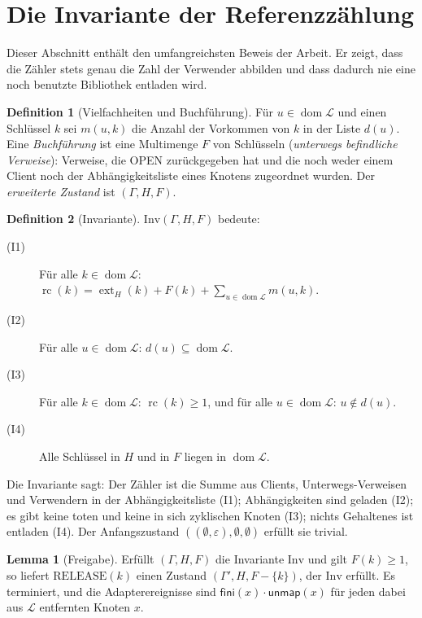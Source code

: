 \documentclass[a4paper,12pt,twoside]{report}
\DeclareRobustCommand{\_}{\ifmmode\mbox{\textunderscore}\else\textunderscore\allowbreak{}\fi}
\theoremstyle{definition}
\newtheorem{definition}{Definition}[chapter]
\newtheorem{lemma}{Lemma}[chapter]
\newcommand{\dom}{\operatorname{dom}}
\newcommand{\ext}{\operatorname{ext}}
\newcommand{\rc}{\operatorname{rc}}
\begin{document}
\section{Die Invariante der Referenzzählung}
\label{sec:rc}

Dieser Abschnitt enthält den umfangreichsten Beweis der Arbeit. Er zeigt, dass die Zähler stets genau die Zahl der Verwender abbilden und dass dadurch nie eine noch benutzte Bibliothek entladen wird.

\begin{definition}[Vielfachheiten und Buchführung]
	Für $u\in\dom\mathcal L$ und einen Schlüssel $k$ sei $m(u,k)$ die Anzahl der Vorkommen von $k$ in der Liste $d(u)$. Eine \emph{Buchführung} ist eine Multimenge $F$ von Schlüsseln (\emph{unterwegs befindliche Verweise}): Verweise, die OPEN zurückgegeben hat und die noch weder einem Client noch der Abhängigkeitsliste eines Knotens zugeordnet wurden. Der \emph{erweiterte Zustand} ist $(\Gamma,H,F)$.
\end{definition}

\begin{definition}[Invariante]
	\label{def:inv}
	$\mathrm{Inv}(\Gamma,H,F)$ bedeute:
	\begin{description}
		\item[(I1)] Für alle $k\in\dom\mathcal L$: $\rc(k)=\ext_H(k)+F(k)+\sum_{u\in\dom\mathcal L}m(u,k)$.
		\item[(I2)] Für alle $u\in\dom\mathcal L$: $d(u)\subseteq\dom\mathcal L$.
		\item[(I3)] Für alle $k\in\dom\mathcal L$: $\rc(k)\ge1$, und für alle $u\in\dom\mathcal L$: $u\notin d(u)$.
		\item[(I4)] Alle Schlüssel in $H$ und in $F$ liegen in $\dom\mathcal L$.
	\end{description}
\end{definition}

Die Invariante sagt: Der Zähler ist die Summe aus Clients, Unterwegs-Verweisen und Verwendern in der Abhängigkeitsliste (I1); Abhängigkeiten sind geladen (I2); es gibt keine toten und keine in sich zyklischen Knoten (I3); nichts Gehaltenes ist entladen (I4). Der Anfangszustand $((\emptyset,\varepsilon),\emptyset,\emptyset)$ erfüllt sie trivial.

\begin{lemma}[Freigabe]
	\label{lem:release}
	Erfüllt $(\Gamma,H,F)$ die Invariante $\mathrm{Inv}$ und gilt $F(k)\ge1$, so liefert $\mathrm{RELEASE}(k)$ einen Zustand $(\Gamma',H,F-\{k\})$, der $\mathrm{Inv}$ erfüllt. Es terminiert, und die Adapterereignisse sind $\mathsf{fini}(x)\cdot\mathsf{unmap}(x)$ für jeden dabei aus $\mathcal L$ entfernten Knoten $x$.
\end{lemma}
\end{document}
